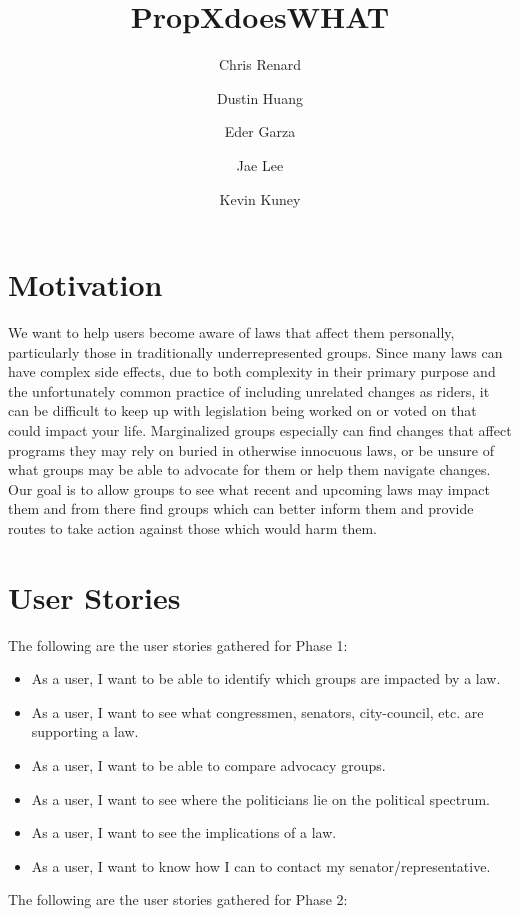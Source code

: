 \documentclass[12pt]{article}
\title{PropXdoesWHAT}
\author{Chris Renard \and Dustin Huang \and Eder Garza \and Jae Lee \and Kevin Kuney}
\date{} %
\begin{document}
\maketitle

\section{Motivation}

We want to help users become aware of laws that affect them personally, particularly those in traditionally underrepresented groups. 
Since many laws can have complex side effects, due to both complexity in their primary purpose and the unfortunately common practice of including unrelated changes as riders, it can be difficult to keep up with legislation being worked on or voted on that could impact your life.
Marginalized groups especially can find changes that affect programs they may rely on buried in otherwise innocuous laws, or be unsure of what groups may be able to advocate for them or help them navigate changes.
Our goal is to allow groups to see what recent and upcoming laws may impact them and from there find groups which can better inform them and provide routes to take action against those which would harm them.


\section{User Stories}

The following are the user stories gathered for Phase 1: \\

\begin{itemize}
	\item As a user, I want to be able to identify which groups are impacted by a law.
	\item As a user, I want to see what congressmen, senators, city-council, etc. are supporting a law.
	\item As a user, I want to be able to compare advocacy groups.
	\item As a user, I want to see where the politicians lie on the political spectrum.
	\item As a user, I want to see the implications of a law.
	\item As a user, I want to know how I can to contact my senator/representative.
	
\end{itemize}


The following are the user stories gathered for Phase 2: \\
	
\end{document}
